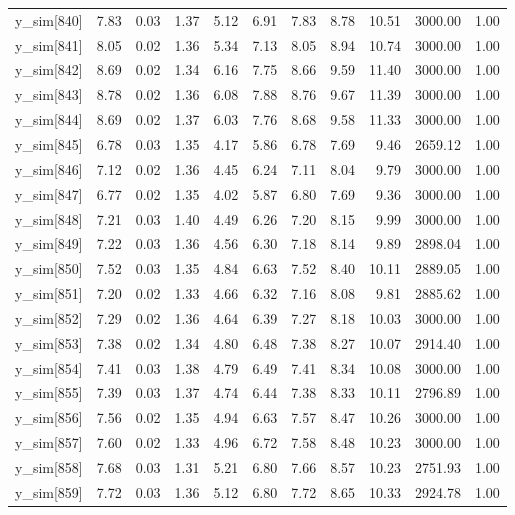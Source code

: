 \begin{table}[ht]
\begin{tabular}{rrrrrrrrrrr}
  y\_sim[840] & 7.83 & 0.03 & 1.37 & 5.12 & 6.91 & 7.83 & 8.78 & 10.51 & 3000.00 & 1.00 \\ 
  y\_sim[841] & 8.05 & 0.02 & 1.36 & 5.34 & 7.13 & 8.05 & 8.94 & 10.74 & 3000.00 & 1.00 \\ 
  y\_sim[842] & 8.69 & 0.02 & 1.34 & 6.16 & 7.75 & 8.66 & 9.59 & 11.40 & 3000.00 & 1.00 \\ 
  y\_sim[843] & 8.78 & 0.02 & 1.36 & 6.08 & 7.88 & 8.76 & 9.67 & 11.39 & 3000.00 & 1.00 \\ 
  y\_sim[844] & 8.69 & 0.02 & 1.37 & 6.03 & 7.76 & 8.68 & 9.58 & 11.33 & 3000.00 & 1.00 \\ 
  y\_sim[845] & 6.78 & 0.03 & 1.35 & 4.17 & 5.86 & 6.78 & 7.69 & 9.46 & 2659.12 & 1.00 \\ 
  y\_sim[846] & 7.12 & 0.02 & 1.36 & 4.45 & 6.24 & 7.11 & 8.04 & 9.79 & 3000.00 & 1.00 \\ 
  y\_sim[847] & 6.77 & 0.02 & 1.35 & 4.02 & 5.87 & 6.80 & 7.69 & 9.36 & 3000.00 & 1.00 \\ 
  y\_sim[848] & 7.21 & 0.03 & 1.40 & 4.49 & 6.26 & 7.20 & 8.15 & 9.99 & 3000.00 & 1.00 \\ 
  y\_sim[849] & 7.22 & 0.03 & 1.36 & 4.56 & 6.30 & 7.18 & 8.14 & 9.89 & 2898.04 & 1.00 \\ 
  y\_sim[850] & 7.52 & 0.03 & 1.35 & 4.84 & 6.63 & 7.52 & 8.40 & 10.11 & 2889.05 & 1.00 \\ 
  y\_sim[851] & 7.20 & 0.02 & 1.33 & 4.66 & 6.32 & 7.16 & 8.08 & 9.81 & 2885.62 & 1.00 \\ 
  y\_sim[852] & 7.29 & 0.02 & 1.36 & 4.64 & 6.39 & 7.27 & 8.18 & 10.03 & 3000.00 & 1.00 \\ 
  y\_sim[853] & 7.38 & 0.02 & 1.34 & 4.80 & 6.48 & 7.38 & 8.27 & 10.07 & 2914.40 & 1.00 \\ 
  y\_sim[854] & 7.41 & 0.03 & 1.38 & 4.79 & 6.49 & 7.41 & 8.34 & 10.08 & 3000.00 & 1.00 \\ 
  y\_sim[855] & 7.39 & 0.03 & 1.37 & 4.74 & 6.44 & 7.38 & 8.33 & 10.11 & 2796.89 & 1.00 \\ 
  y\_sim[856] & 7.56 & 0.02 & 1.35 & 4.94 & 6.63 & 7.57 & 8.47 & 10.26 & 3000.00 & 1.00 \\ 
  y\_sim[857] & 7.60 & 0.02 & 1.33 & 4.96 & 6.72 & 7.58 & 8.48 & 10.23 & 3000.00 & 1.00 \\ 
  y\_sim[858] & 7.68 & 0.03 & 1.31 & 5.21 & 6.80 & 7.66 & 8.57 & 10.23 & 2751.93 & 1.00 \\ 
  y\_sim[859] & 7.72 & 0.03 & 1.36 & 5.12 & 6.80 & 7.72 & 8.65 & 10.33 & 2924.78 & 1.00 \\ 

\end{tabular}
\end{table}
